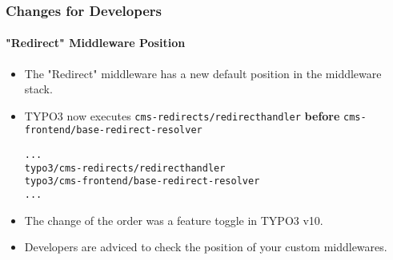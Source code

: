%

\begin{frame}[fragile]
	\frametitle{Changes for Developers}
	\framesubtitle{"Redirect" Middleware Position}


	\begin{itemize}
		\item The "Redirect" middleware has a new default position in the middleware stack.
		\item TYPO3 now executes
			\small\texttt{cms-redirects/redirecthandler}\normalsize\newline
			\textbf{before}
			\texttt{cms-frontend/base-redirect-resolver}\normalsize
\begin{lstlisting}
...
typo3/cms-redirects/redirecthandler
typo3/cms-frontend/base-redirect-resolver
...
\end{lstlisting}

		\item The change of the order was a feature toggle in TYPO3 v10.
		\item Developers are adviced to check the position of your custom middlewares.

	\end{itemize}

\end{frame}

